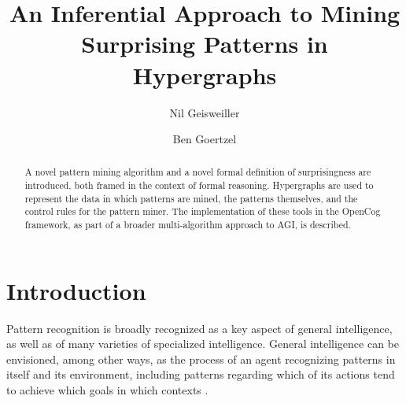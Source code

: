 \documentclass[runningheads]{llncs}
\begin{document}
%
\title{An Inferential Approach to Mining Surprising Patterns in Hypergraphs}
%
%
\author{Nil Geisweiller
  \and Ben Goertzel}
%
%
%
\maketitle              %
%

\begin{abstract}
  A novel pattern mining algorithm and a novel formal definition of
  surprisingness are introduced, both framed in the context of formal
  reasoning.  Hypergraphs are used to represent the data in which
  patterns are mined, the patterns themselves, and the control rules
  for the pattern miner.  The implementation of these tools in the
  OpenCog framework, as part of a broader multi-algorithm approach to
  AGI, is described.

\end{abstract}

\section{Introduction}

Pattern recognition is broadly recognized as a key aspect of general
intelligence, as well as of many varieties of specialized
intelligence.
General
intelligence can be envisioned, among other ways, as the process of an
agent recognizing patterns in itself and its environment, including
patterns regarding which of its actions tend to achieve which goals in
which contexts \cite{Goertzel2014EGI1}.
\end{document}

